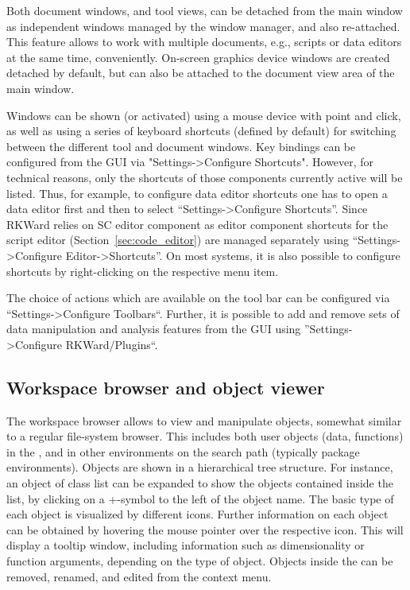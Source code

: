 Both document windows, and tool views, can be detached from the main
window as independent windows managed by the window manager, and also
re-attached. This feature allows to work with multiple documents, e.g.,
scripts or data editors at the same time, conveniently. On{}-screen
graphics device windows are created detached by default, but can also
be attached to the document view area of the main window.

Windows can be shown (or activated) using a mouse device with point and
click, as well as using a series of keyboard shortcuts (defined by
default) for switching between the different tool and document windows.
Key bindings can be configured from the GUI via "Settings->Configure Shortcuts". 
However, for technical reasons, only the shortcuts of those
components currently active will be listed. Thus, for example, to
configure data editor shortcuts one has to open a data editor first and
then to select ``Settings->Configure Shortcuts''. Since RKWard relies on
 SC editor component as editor component
shortcuts for the script editor (Section~\ref{sec:code_editor}) are managed separately using
``Settings->Configure Editor->Shortcuts''. On most systems, it is also
possible to configure shortcuts by right-clicking on the respective
menu item.

The choice of actions which are available on the tool bar can be
configured via ``Settings->Configure Toolbars``. Further, it is possible to add and remove sets
of data manipulation and analysis features from the GUI using
''Settings->Configure RKWard/Plugins``.

\subsection{Workspace browser and object viewer}
\label{sec:workspace_browser_object_viewer}

The workspace browser allows to view
and manipulate  objects, somewhat similar
to a regular file-system browser. This includes both user objects
(data, functions) in the , and in other environments on the
 search path (typically
 package environments). Objects are shown
in a hierarchical tree structure. For instance, an object of class
list can be expanded to show the objects
contained inside the list, by clicking on a
+-symbol to the left of the object name.
The basic type of each object is visualized by different icons. Further
information on each object can be obtained by hovering the mouse
pointer over the respective icon. This will display a tooltip window,
including information such as dimensionality or function arguments,
depending on the type of object. Objects inside the  can be
removed, renamed, and edited from the context menu.

